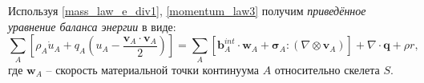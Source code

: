 	Используя \eqref{mass_law_e_div1}, \eqref{momentum_law3} получим \textit{приведённое уравнение баланса энергии} в виде:
\begin{equation}
	\label{energy_law4}
	\sum\limits_{A}\left[\rho_A \dot{u}_A + q_A\left(u_A - \frac{\boldsymbol{v}_A \cdot \boldsymbol{v}_A}{2}\right)\right] = 
	\sum\limits_{A}\left[\boldsymbol{b}_A^{int}\cdot \boldsymbol{w}_A + \boldsymbol{\sigma}_A : (\nabla \otimes \boldsymbol{v}_A)\right] + 
	\nabla \cdot \boldsymbol{q} + \rho r,
\end{equation}
	где $\boldsymbol{w}_A$ -- скорость материальной точки континуума $A$ относительно скелета $S$.

	 